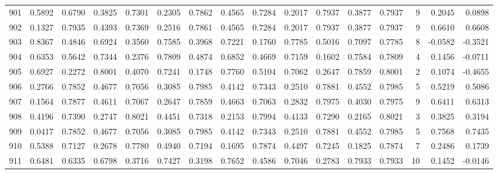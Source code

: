 \begin{tabular}{lrrrrrrrrrrrrrrr}
901 &      0.5892 &  0.6790 &  0.3825 &  0.7301 &  0.2305 &  0.7862 &  0.4565 &  0.7284 &  0.2017 &  0.7937 &   0.3877 &     0.7937 &      9 &                    0.2045 &                     0.0898 \\
902 &      0.1327 &  0.7935 &  0.4393 &  0.7369 &  0.2516 &  0.7861 &  0.4565 &  0.7284 &  0.2017 &  0.7937 &   0.3877 &     0.7937 &      9 &                    0.6610 &                     0.6608 \\
903 &      0.8367 &  0.4846 &  0.6924 &  0.3560 &  0.7585 &  0.3968 &  0.7221 &  0.1760 &  0.7785 &  0.5016 &   0.7097 &     0.7785 &      8 &                   -0.0582 &                    -0.3521 \\
904 &      0.6353 &  0.5642 &  0.7344 &  0.2376 &  0.7809 &  0.4874 &  0.6852 &  0.4669 &  0.7159 &  0.1602 &   0.7584 &     0.7809 &      4 &                    0.1456 &                    -0.0711 \\
905 &      0.6927 &  0.2272 &  0.8001 &  0.4070 &  0.7241 &  0.1748 &  0.7760 &  0.5104 &  0.7062 &  0.2647 &   0.7859 &     0.8001 &      2 &                    0.1074 &                    -0.4655 \\
906 &      0.2766 &  0.7852 &  0.4677 &  0.7056 &  0.3085 &  0.7985 &  0.4142 &  0.7343 &  0.2510 &  0.7881 &   0.4552 &     0.7985 &      5 &                    0.5219 &                     0.5086 \\
907 &      0.1564 &  0.7877 &  0.4611 &  0.7067 &  0.2647 &  0.7859 &  0.4663 &  0.7063 &  0.2832 &  0.7975 &   0.4030 &     0.7975 &      9 &                    0.6411 &                     0.6313 \\
908 &      0.4196 &  0.7390 &  0.2747 &  0.8021 &  0.4451 &  0.7318 &  0.2153 &  0.7994 &  0.4133 &  0.7290 &   0.2165 &     0.8021 &      3 &                    0.3825 &                     0.3194 \\
909 &      0.0417 &  0.7852 &  0.4677 &  0.7056 &  0.3085 &  0.7985 &  0.4142 &  0.7343 &  0.2510 &  0.7881 &   0.4552 &     0.7985 &      5 &                    0.7568 &                     0.7435 \\
910 &      0.5388 &  0.7127 &  0.2678 &  0.7780 &  0.4940 &  0.7194 &  0.1695 &  0.7874 &  0.4497 &  0.7245 &   0.1825 &     0.7874 &      7 &                    0.2486 &                     0.1739 \\
911 &      0.6481 &  0.6335 &  0.6798 &  0.3716 &  0.7427 &  0.3198 &  0.7652 &  0.4586 &  0.7046 &  0.2783 &   0.7933 &     0.7933 &     10 &                    0.1452 &                    -0.0146 \\

\end{tabular}

